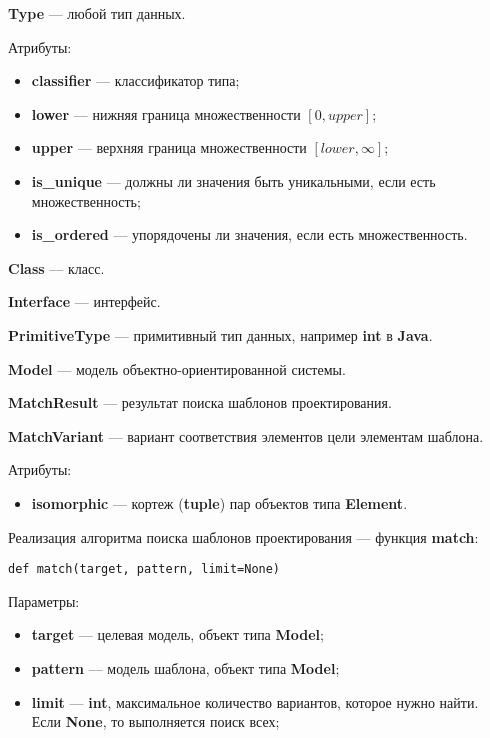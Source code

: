 \textbf{Type} --- любой тип данных.

Атрибуты:
\begin{itemize}
\item \textbf{classifier} --- классификатор типа;
\item \textbf{lower} --- нижняя граница множественности $\left [ 0, upper \right ]$;
\item \textbf{upper} --- верхняя граница множественности $\left [ lower, \infty \right ]$;
\item \textbf{is\_unique} --- должны ли значения быть уникальными, если есть множественность;
\item \textbf{is\_ordered} --- упорядочены ли значения, если есть множественность.
\end{itemize}

\textbf{Class} --- класс.

\textbf{Interface} --- интерфейс.

\textbf{PrimitiveType} --- примитивный тип данных, например \textbf{int} в \textbf{Java}.

\textbf{Model} --- модель объектно-ориентированной системы.

\textbf{MatchResult} --- результат поиска шаблонов проектирования.

\textbf{MatchVariant} --- вариант соответствия элементов цели элементам шаблона.

Атрибуты:
\begin{itemize}
\item \textbf{isomorphic} --- кортеж (\textbf{tuple}) пар объектов типа \textbf{Element}.
\end{itemize}

Реализация алгоритма поиска шаблонов проектирования --- функция \textbf{match}:

\begin{verbatim}
def match(target, pattern, limit=None)
\end{verbatim}

Параметры:
\begin{itemize}
\item \textbf{target} --- целевая модель, объект типа \textbf{Model};
\item \textbf{pattern} --- модель шаблона, объект типа \textbf{Model};
\item \textbf{limit} --- \textbf{int}, максимальное количество
вариантов, которое нужно найти. Если \textbf{None}, то выполняется поиск всех;
\end{itemize}

